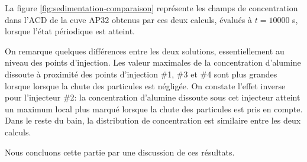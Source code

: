 La figure \ref{fig:sedimentation-comparaison} représente les champs de
concentration dans l'ACD de la cuve AP32 obtenus par ces deux calculs,
évalués à $t = \num{10000}$ \si{\second}, lorsque l'état périodique est
atteint.



On remarque quelques différences entre les deux solutions,
essentiellement au niveau des points d'injection. Les valeur maximales
de la concentration d'alumine dissoute à proximité des points
d'injection \#1, \#3 et \#4 sont plus grandes lorsque lorsque la chute
des particules est négligée. On constate l'effet inverse pour
l'injecteur \#2: la concentration d'alumine dissoute sous cet
injecteur atteint un maximum local plus marqué lorsque la chute des
particules est pris en compte. Dans le reste du bain, la distribution
de concentration est similaire entre les deux calculs.

Nous concluons cette partie par une discussion de ces résultats.
